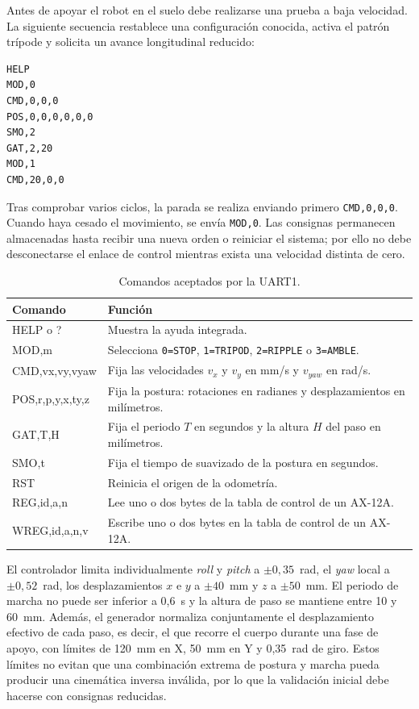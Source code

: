 Antes de apoyar el robot en el suelo debe realizarse una prueba a baja
velocidad. La siguiente secuencia restablece una configuración conocida, activa
el patrón trípode y solicita un avance longitudinal reducido:

\begin{lstlisting}[basicstyle=\ttfamily\small,frame=single]
HELP
MOD,0
CMD,0,0,0
POS,0,0,0,0,0,0
SMO,2
GAT,2,20
MOD,1
CMD,20,0,0
\end{lstlisting}

Tras comprobar varios ciclos, la parada se realiza enviando primero
\texttt{CMD,0,0,0}. Cuando haya cesado el movimiento, se envía \texttt{MOD,0}.
Las consignas permanecen almacenadas hasta recibir una nueva orden o reiniciar
el sistema; por ello no debe desconectarse el enlace de control mientras exista
una velocidad distinta de cero.

\begin{table}[H]
    \centering
    \footnotesize
    \begin{tabularx}{\textwidth}{@{}>{\ttfamily}lX@{}}
        \toprule
        \normalfont\textbf{Comando} & \textbf{Función} \\
        \midrule
        HELP o ? & Muestra la ayuda integrada. \\
        MOD,m & Selecciona \texttt{0=STOP}, \texttt{1=TRIPOD}, \texttt{2=RIPPLE} o \texttt{3=AMBLE}. \\
        CMD,vx,vy,vyaw & Fija las velocidades $v_x$ y $v_y$ en mm/s y $v_{yaw}$ en rad/s. \\
        POS,r,p,y,x,ty,z & Fija la postura: rotaciones en radianes y desplazamientos en milímetros. \\
        GAT,T,H & Fija el periodo $T$ en segundos y la altura $H$ del paso en milímetros. \\
        SMO,t & Fija el tiempo de suavizado de la postura en segundos. \\
        RST & Reinicia el origen de la odometría. \\
        REG,id,a,n & Lee uno o dos bytes de la tabla de control de un AX-12A. \\
        WREG,id,a,n,v & Escribe uno o dos bytes en la tabla de control de un AX-12A. \\
        \bottomrule
    \end{tabularx}
    \caption{Comandos aceptados por la UART1.}
    \label{tab:manual_comandos_uart}
\end{table}

El controlador limita individualmente \textit{roll} y \textit{pitch} a
$\pm0{,}35$~rad, el \textit{yaw} local a $\pm0{,}52$~rad, los desplazamientos
$x$ e $y$ a $\pm40$~mm y $z$ a $\pm50$~mm. El periodo de marcha no puede ser
inferior a 0,6~s y la altura de paso se mantiene entre 10 y 60~mm. Además, el
generador normaliza conjuntamente el desplazamiento efectivo de cada paso, es
decir, el que recorre el cuerpo durante una fase de apoyo, con límites de
120~mm en X, 50~mm en Y y 0,35~rad de giro. Estos límites no evitan
que una combinación extrema de postura y marcha pueda producir una cinemática
inversa inválida, por lo que la validación inicial debe hacerse con consignas
reducidas.

